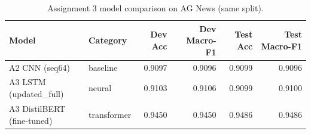 \begin{table}[H]
\centering
\begin{tabular}{l l r r r r}
\hline
Model & Category & Dev Acc & Dev Macro-F1 & Test Acc & Test Macro-F1 \\
\hline
A2 CNN (seq64) & baseline & 0.9097 & 0.9096 & 0.9099 & 0.9096 \\
A3 LSTM (updated_full) & neural & 0.9103 & 0.9106 & 0.9099 & 0.9100 \\
A3 DistilBERT (fine-tuned) & transformer & 0.9450 & 0.9450 & 0.9486 & 0.9486 \\
\hline
\end{tabular}
\caption{Assignment 3 model comparison on AG News (same split).}
\label{tab:a3_model_comparison}
\end{table}
